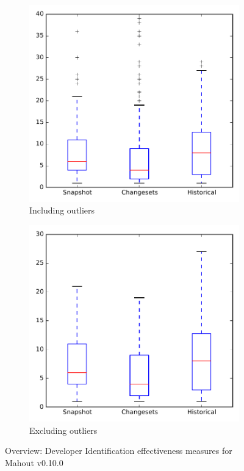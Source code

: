 
\begin{figure}
    \centering
    \begin{subfigure}{.4\textwidth}
        \centering
        \includegraphics[height=0.4\textheight]{figures/dit/all_mahout}
        \caption{Including outliers}\label{fig:dit:all:mahout_outlier}
    \end{subfigure}%
    \begin{subfigure}{.4\textwidth}
        \centering
        \includegraphics[height=0.4\textheight]{figures/dit/all_mahout_no_outlier}
        \caption{Excluding outliers}\label{fig:dit:all:mahout_no_outlier}
    \end{subfigure}
\caption{Overview: Developer Identification effectiveness measures for Mahout v0.10.0}
\label{fig:dit:all:mahout}
\end{figure}
